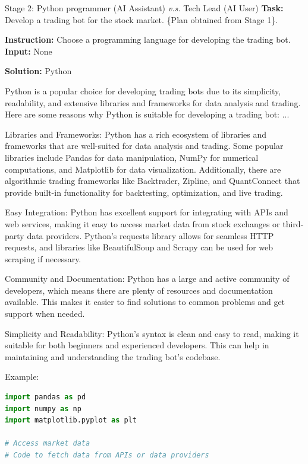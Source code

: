 \begin{AIBoxBreak}{Stage 2: Python programmer (AI Assistant) \textit{v.s.} Tech Lead (AI User)}
\textbf{Task:} Develop a trading bot for the stock market.
\{Plan obtained from Stage 1\}.


\usermsg

\textbf{Instruction:} Choose a programming language for developing the trading bot. \textbf{Input:} None

\assistantmsg

\textbf{Solution:} Python

Python is a popular choice for developing trading bots due to its simplicity, readability, and extensive libraries and frameworks for data analysis and trading. Here are some reasons why Python is suitable for developing a trading bot: ...

Libraries and Frameworks: Python has a rich ecosystem of libraries and frameworks that are well-suited for data analysis and trading. Some popular libraries include Pandas for data manipulation, NumPy for numerical computations, and Matplotlib for data visualization. Additionally, there are algorithmic trading frameworks like Backtrader, Zipline, and QuantConnect that provide built-in functionality for backtesting, optimization, and live trading.

Easy Integration: Python has excellent support for integrating with APIs and web services, making it easy to access market data from stock exchanges or third-party data providers. Python’s requests library allows for seamless HTTP requests, and libraries like BeautifulSoup and Scrapy can be used for web scraping if necessary.

Community and Documentation: Python has a large and active community of developers, which means there are plenty of resources and documentation available. This makes it easier to find solutions to common problems and get support when needed.

Simplicity and Readability: Python’s syntax is clean and easy to read, making it suitable for both beginners and experienced developers. This can help in maintaining and understanding the trading bot’s codebase.

Example:

\begin{lstlisting}[language=Python]
import pandas as pd
import numpy as np
import matplotlib.pyplot as plt

# Access market data
# Code to fetch data from APIs or data providers


\end{lstlisting}
\end{AIBoxBreak}

